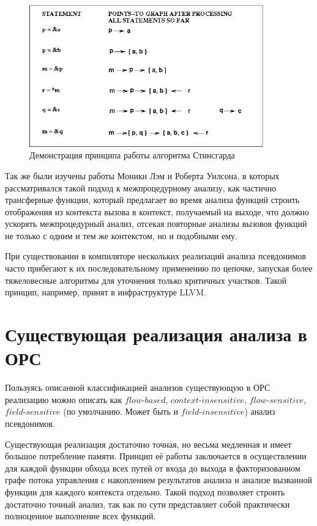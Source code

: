 \begin{figure}[H]
\centering
\caption{\label{fig:steensgaard} Демонстрация принципа работы алгоритма Стинсгарда}
\includegraphics[width=0.9\textwidth]{img/steensgaard.jpg}
\end{figure}

Так же были изучены работы Моники Лэм и Роберта Уилсона, в которых рассматривался такой подход к межпроцедурному анализу, как частично трансферные функции, который предлагает во время анализа функций строить отображения из контекста вызова в контекст, получаемый на выходе, что должно ускорять межпроцедурный анализ, отсекая повторные анализы вызовов функций не только с одним и тем же контекстом, но и подобными ему.

При существовании в компиляторе нескольких реализаций анализа псевдонимов часто прибегают к их последовательному применению по цепочке, запуская более тяжеловесные алгоритмы для уточнения только критичных участков. Такой принцип, например, принят в инфраструктуре LLVM.

\section{Существующая реализация анализа в ОРС}

Пользуясь описанной классификацией анализов существующую в ОРС реализацию можно описать как $flow$-$based$, $context$-$insensitive$, $flow$-$sensitive$, $field$-$sensitive$ (по умолчанию. Может быть и $field$-$insensitive$) анализ псевдонимов.

Существующая реализация достаточно точная, но весьма медленная и имеет большое потребление памяти. Принцип её работы заключается в осуществлении для каждой функции обхода всех путей от входа до выхода в факторизованном графе потока управления с накоплением результатов анализа и анализе вызванной функции для каждого контекста отдельно. Такой подход позволяет строить достаточно точный анализ, так как по сути представляет собой практически полноценное выполнение всех функций.

